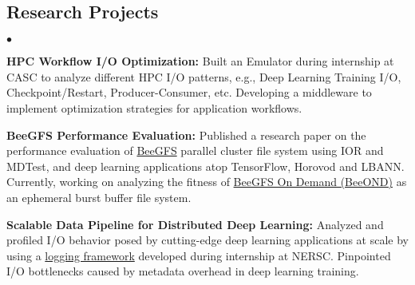 \documentclass[margin,line]{res}
\newenvironment{list2}{
  \begin{list}{$\bullet$}{%
      \setlength{\itemsep}{0in}
      \setlength{\parsep}{0in} \setlength{\parskip}{0in}
      \setlength{\topsep}{0in} \setlength{\partopsep}{0in} 
      \setlength{\leftmargin}{0.2in}}}{\end{list}}
\begin{document}
\begin{resume}
\section{\sc Research Projects}
\begin{list2}
\item {\bf HPC Workflow I/O Optimization:} Built an Emulator during internship at CASC to analyze different HPC I/O patterns, e.g., Deep Learning Training I/O, Checkpoint/Restart, Producer-Consumer, etc. Developing a middleware to implement optimization strategies for application workflows.
\item {\bf BeeGFS Performance Evaluation:} Published a research paper on the performance evaluation of \href{https://www.beegfs.io/content/}{BeeGFS} parallel cluster file system using IOR and MDTest, and deep learning applications atop TensorFlow, Horovod and LBANN. Currently, working on analyzing the fitness of \href{http://www.beegfs.io/wiki/BeeOND}{BeeGFS On Demand (BeeOND)} as an ephemeral burst buffer file system.
\item {\bf Scalable Data Pipeline for Distributed Deep Learning:} Analyzed and profiled I/O behavior posed by cutting-edge deep learning applications at scale by using a \href{https://github.com/NERSC/DL-Parallel-IO}{logging framework} developed during internship at NERSC. Pinpointed I/O bottlenecks caused by metadata overhead in deep learning training.
\end{list2}

\vspace*{-.1in}


\end{resume}
\end{document}
